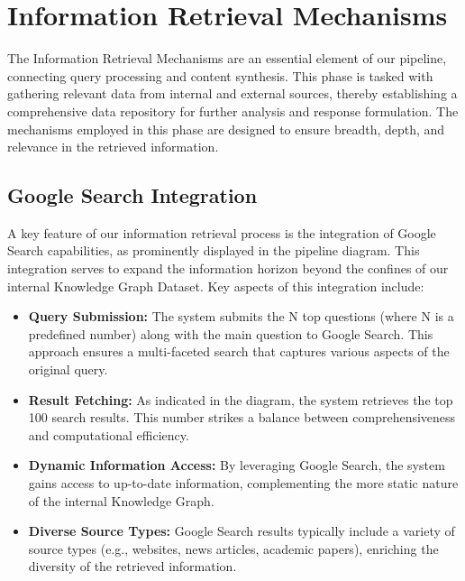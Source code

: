 \section{Information Retrieval Mechanisms}\label{sec:information-retrieval-mechanisms}
The Information Retrieval Mechanisms are an essential element of our pipeline, connecting query processing and content synthesis.
This phase is tasked with gathering relevant data from internal and external sources, thereby establishing a comprehensive data repository for further analysis and response formulation.
The mechanisms employed in this phase are designed to ensure breadth, depth, and relevance in the retrieved information.

\subsection{Google Search Integration}\label{subsec:google-search-integration}
A key feature of our information retrieval process is the integration of Google Search capabilities, as prominently displayed in the pipeline diagram.
This integration serves to expand the information horizon beyond the confines of our internal Knowledge Graph Dataset.
Key aspects of this integration include:

\begin{itemize}
    \item \textbf{Query Submission:} The system submits the N top questions (where N is a predefined number) along with the main question to Google Search. This approach ensures a multi-faceted search that captures various aspects of the original query.
    \item \textbf{Result Fetching:} As indicated in the diagram, the system retrieves the top 100 search results. This number strikes a balance between comprehensiveness and computational efficiency.
    \item \textbf{Dynamic Information Access:} By leveraging Google Search, the system gains access to up-to-date information, complementing the more static nature of the internal Knowledge Graph.
    \item \textbf{Diverse Source Types:} Google Search results typically include a variety of source types (e.g., websites, news articles, academic papers), enriching the diversity of the retrieved information.
\end{itemize}

